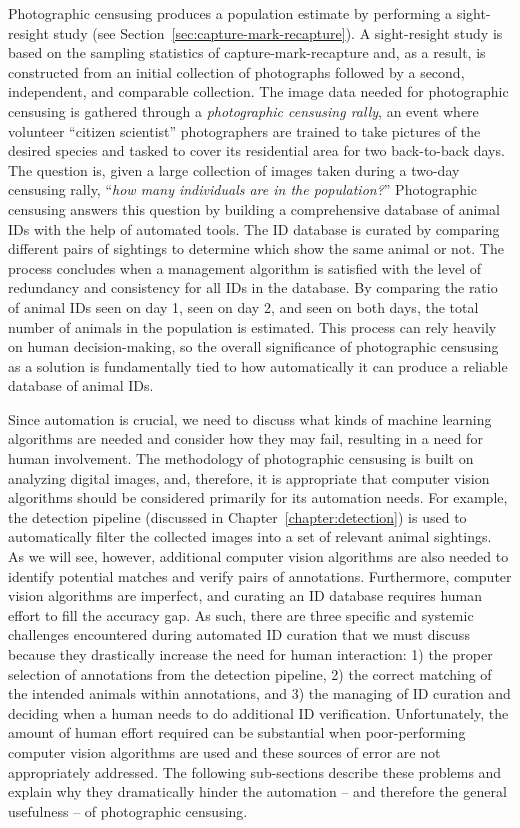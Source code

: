 Photographic censusing produces a population estimate by performing a sight-resight study (see Section~\ref{sec:capture-mark-recapture}).  A sight-resight study is based on the sampling statistics of capture-mark-recapture and, as a result, is constructed from an initial collection of photographs followed by a second, independent, and comparable collection.  The image data needed for photographic censusing is gathered through a \textit{photographic censusing rally}, an event where volunteer ``citizen scientist'' photographers are trained to take pictures of the desired species and tasked to cover its residential area for two back-to-back days.  The question is, given a large collection of images taken during a two-day censusing rally, ``\textit{how many individuals are in the population?}''  Photographic censusing answers this question by building a comprehensive database of animal IDs with the help of automated tools.  The ID database is curated by comparing different pairs of sightings to determine which show the same animal or not. The process concludes when a management algorithm is satisfied with the level of redundancy and consistency for all IDs in the database.  By comparing the ratio of animal IDs seen on day 1, seen on day 2, and seen on both days, the total number of animals in the population is estimated.  This process can rely heavily on human decision-making, so the overall significance of photographic censusing as a solution is fundamentally tied to how automatically it can produce a reliable database of animal IDs.

Since automation is crucial, we need to discuss what kinds of machine learning algorithms are needed and consider how they may fail, resulting in a need for human involvement.  The methodology of photographic censusing is built on analyzing digital images, and, therefore, it is appropriate that computer vision algorithms should be considered primarily for its automation needs.  For example, the detection pipeline (discussed in Chapter~\ref{chapter:detection}) is used to automatically filter the collected images into a set of relevant animal sightings.  As we will see, however, additional computer vision algorithms are also needed to identify potential matches and verify pairs of annotations.  Furthermore, computer vision algorithms are imperfect, and curating an ID database requires human effort to fill the accuracy gap.  As such, there are three specific and systemic challenges encountered during automated ID curation that we must discuss because they drastically increase the need for human interaction: 1) the proper selection of annotations from the detection pipeline, 2) the correct matching of the intended animals within annotations, and 3) the managing of ID curation and deciding when a human needs to do additional ID verification.  Unfortunately, the amount of human effort required can be substantial when poor-performing computer vision algorithms are used and these sources of error are not appropriately addressed.  The following sub-sections describe these problems and explain why they dramatically hinder the automation -- and therefore the general usefulness -- of photographic censusing.

